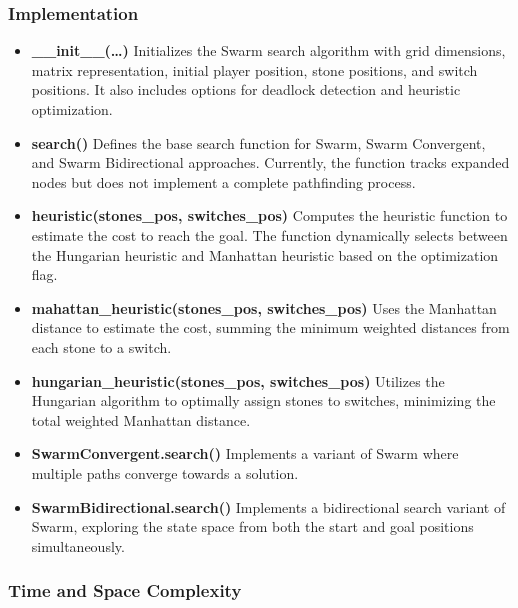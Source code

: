 \subsubsection{Implementation}
\begin{itemize}
      \item \textbf{\_\_init\_\_(\ldots)}
            Initializes the Swarm search algorithm with grid dimensions, matrix representation, initial player position, stone positions, and switch positions. It also includes options for deadlock detection and heuristic optimization.

      \item \textbf{search()}
            Defines the base search function for Swarm, Swarm Convergent, and Swarm Bidirectional approaches. Currently, the function tracks expanded nodes but does not implement a complete pathfinding process.

      \item \textbf{heuristic(stones\_pos, switches\_pos)}
            Computes the heuristic function to estimate the cost to reach the goal. The function dynamically selects between the Hungarian heuristic and Manhattan heuristic based on the optimization flag.

      \item \textbf{mahattan\_heuristic(stones\_pos, switches\_pos)}
            Uses the Manhattan distance to estimate the cost, summing the minimum weighted distances from each stone to a switch.

      \item \textbf{hungarian\_heuristic(stones\_pos, switches\_pos)}
            Utilizes the Hungarian algorithm to optimally assign stones to switches, minimizing the total weighted Manhattan distance.

      \item \textbf{SwarmConvergent.search()}
            Implements a variant of Swarm where multiple paths converge towards a solution.

      \item \textbf{SwarmBidirectional.search()}
            Implements a bidirectional search variant of Swarm, exploring the state space from both the start and goal positions simultaneously.
\end{itemize}

\subsubsection{Time and Space Complexity}


